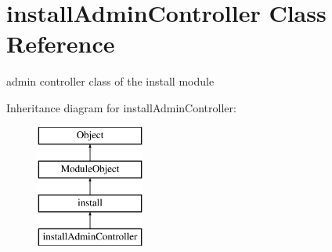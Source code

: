 \hypertarget{classinstallAdminController}{\section{install\+Admin\+Controller Class Reference}
\label{classinstallAdminController}
}


admin controller class of the install module  


Inheritance diagram for install\+Admin\+Controller\+:\begin{figure}[H]
\begin{center}
\leavevmode
\includegraphics[height=4.000000cm]{classinstallAdminController}
\end{center}
\end{figure}
